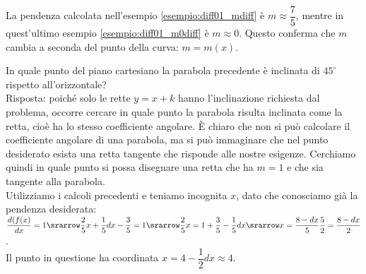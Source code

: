 \begin{osservazione}
La pendenza calcolata nell'esempio \ref{esempio:diff01_mdiff} è 
$m\approx\dfrac{7}{5}$, mentre in quest'ultimo esempio 
\ref{esempio:diff01_m0diff} è
$m\approx 0$. Questo conferma che $m$ cambia a seconda del punto della 
curva: $m=m(x)$.
\end{osservazione}

\begin{esempio}
 In quale punto del piano cartesiano la parabola precedente è inclinata 
 di $45^\circ$ rispetto all'orizzontale?\\
 Risposta: poiché solo le rette $y=x+k$ hanno l'inclinazione richiesta dal 
problema, occorre cercare in quale punto
 la parabola risulta inclinata come la retta, cioè ha lo stesso 
coefficiente  angolare. È chiaro che non si può calcolare il coefficiente 
angolare di una parabola, ma si può immaginare che nel punto desiderato esista 
una retta tangente che risponde alle nostre esigenze. Cerchiamo quindi in quale
 punto si possa disegnare una retta che ha $m=1$ e che sia tangente 
 alla parabola.\\
 Utilizziamo i calcoli precedenti e teniamo incognita $x$, dato che conosciamo
 già la pendenza desiderata:\\
 $\dfrac{d(f(x)}{dx}=1 \srarrow 
 \dfrac{2}{5}x+\dfrac{1}{5}dx-\dfrac{3}{5}=1
 \srarrow \dfrac{2}{5}x=1+\dfrac{3}{5}-\dfrac{1}{5}dx
 \srarrow x=\dfrac{8-dx}{5}\dfrac{5}{2}=\dfrac{8-dx}{2}$.\\
 Il punto in questione ha coordinata $x= 4-\dfrac{1}{2}dx\approx 4$.  
\end{esempio}

